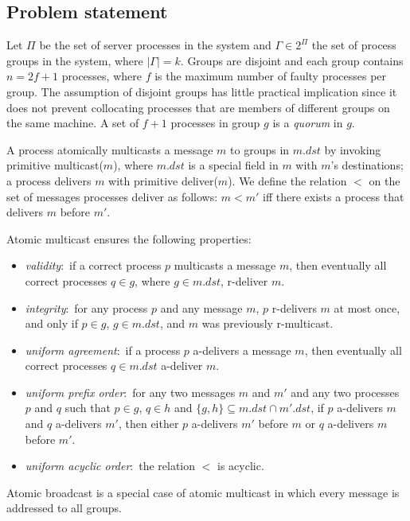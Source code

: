 \subsection{Problem statement}
\label{sec:amcast}

Let $\Pi$ be the set of server processes in the system and $\Gamma \in 2^{\Pi}$ the set of process groups in the system, where $|\Gamma| = k$.
Groups are disjoint and each group contains $n = 2f+1$ processes, where $f$ is the maximum number of faulty processes per group.  
The assumption of disjoint groups has little practical implication since it does not prevent collocating processes that are members of different groups on the same machine.
A set of $f + 1$ processes in group $g$ is a \emph{quorum} in $g$.

A process atomically multicasts a message $m$ to groups in $m.dst$ by invoking primitive multicast($m$), where $m.dst$ is a special field in $m$ with $m$'s destinations; a process delivers $m$ with primitive deliver($m$). 
We define the relation $<$ on the set of messages processes deliver as follows: $m < m'$ iff there exists a process that delivers $m$ before $m'$. 

Atomic multicast ensures the following properties: 
\begin{itemize}
\item \textit{validity}:~if a correct process $p$ multicasts a message $m$, then eventually all correct processes $q \in g$, where $g \in m.\mathit{dst}$, r-deliver $m$.
\item \textit{integrity}:~for any process $p$ and any message $m$, $p$ r-delivers $m$ at most once, and only if $p \in g$, $g \in m.\mathit{dst}$, and $m$ was previously r-multicast.
\item \textit{uniform agreement}:~if a process $p$ a-delivers a message $m$, then eventually all correct processes $q\in m.\mathit{dst}$ a-deliver $m$.
\item \textit{uniform prefix order}:~for any two messages $m$ and $m'$ and any two processes $p$ and $q$ such that $p \in g$, $q \in h$ and $\{ g, h \} \subseteq m.\mathit{dst} \cap m'.\mathit{dst}$, if $p$ a-delivers $m$ and $q$ a-delivers $m'$, then either $p$ a-delivers $m'$ before $m$ or $q$ a-delivers $m$ before $m'$.
\item \textit{uniform acyclic order}:~the relation $<$ is acyclic.
\end{itemize}
Atomic broadcast is a special case of atomic multicast in which every message is addressed to all groups.

